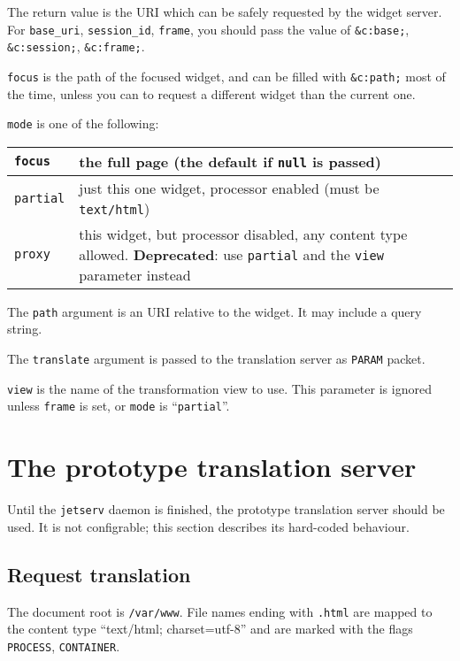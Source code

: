 \documentclass[a4paper,12pt]{article}
\begin{document}
The return value is the URI which can be safely requested by the
widget server.  For \texttt{base\_uri}, \texttt{session\_id},
\texttt{frame}, you should pass the value of \texttt{\&c:base;},
\texttt{\&c:session;}, \texttt{\&c:frame;}.

\texttt{focus} is the path of the focused widget, and can be filled
with \texttt{\&c:path;} most of the time, unless you can to request a
different widget than the current one.

\texttt{mode} is one of the following:

\begin{tabular}{|l|p{12cm}|}
\hline

\texttt{focus} & the full page (the default if \texttt{null} is
passed) \\

\hline

\texttt{partial} & just this one widget, processor enabled (must be
\texttt{text/html}) \\

\hline
\texttt{proxy} & this widget, but processor disabled, any content type
allowed.
\textbf{Deprecated}: use \texttt{partial} and the \texttt{view}
parameter instead \\
\hline
\end{tabular}

The \texttt{path} argument is an URI relative to the widget.  It may
include a query string.

The \texttt{translate} argument is passed to the translation server as
\texttt{PARAM} packet.

\texttt{view} is the name of the transformation view to use.  This
parameter is ignored unless \texttt{frame} is set, or \texttt{mode} is
``\texttt{partial}''.


\section{The prototype translation server}

Until the \texttt{jetserv} daemon is finished, the prototype
translation server should be used.  It is not configrable; this
section describes its hard-coded behaviour.

\subsection{Request translation}

The document root is \texttt{/var/www}.  File names ending with
\texttt{.html} are mapped to the content type ``text/html;
charset=utf-8'' and are marked with the flags \texttt{PROCESS},
\texttt{CONTAINER}.
\end{document}
